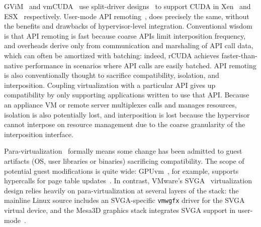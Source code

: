 
 \label{sec:api-remote}
GViM~\cite{gupta2009gvim,vCUDA,gVirtuS} and vmCUDA~\cite{vmCUDA} use
split-driver designs~\cite{pegasus,xen} to support CUDA in Xen~\cite{xen} and
ESX~\cite{esx} respectively. User-mode API remoting~\cite{rCUDA, rCUDAnew,
GridCuda,kim2012snucl,VCL, Duato:2009:EIG:1884795.1884840,
Li:2011:GRS:2066302.2066933, Xiao:2012:TAM:2310096.2310143}, does precisely
the same, without the benefits and drawbacks of hypervisor-level integration.
Conventional wisdom is that API remoting is fast because coarse APIs limit
interposition frequency, and overheads derive only from communication and
marshaling of API call data, which can often be amortized with batching:
indeed, rCUDA achieves faster-than-native performance in scenarios where API
calls are easily batched. API remoting is also conventionally thought to
sacrifice compatibility, isolation, and interposition. Coupling
virtualization with a particular API gives up compatibility by only supporting
applications written to use that API. Because an appliance VM or remote server
multiplexes calls and manages resources, isolation is also potentially lost,
and interposition is lost because the hypervisor cannot interpose on resource
management due to the coarse granularity of the interposition interface.


Para-virtualization~\cite{GPUvm,dowty2009gpu,vasila-gvm16,
vmm-independent-gfx-vee07} formally means some change has been admitted to
guest artifacts (OS, user libraries or binaries) sacrificing compatibility. %
The scope of potential guest modifications is quite wide:
GPUvm~\cite{GPUvm}, for example, supports hypercalls for page table updates~\cite{xen}.
In contrast, VMware's SVGA~\cite{dowty2009gpu} virtualization design relies
heavily on para-virtualization at several layers of the stack: the mainline
Linux source includes an SVGA-specific \texttt{vmwgfx} driver for the SVGA
virtual device, and the Mesa3D graphics stack integrates SVGA support in
user-mode~\cite{mesa}.

